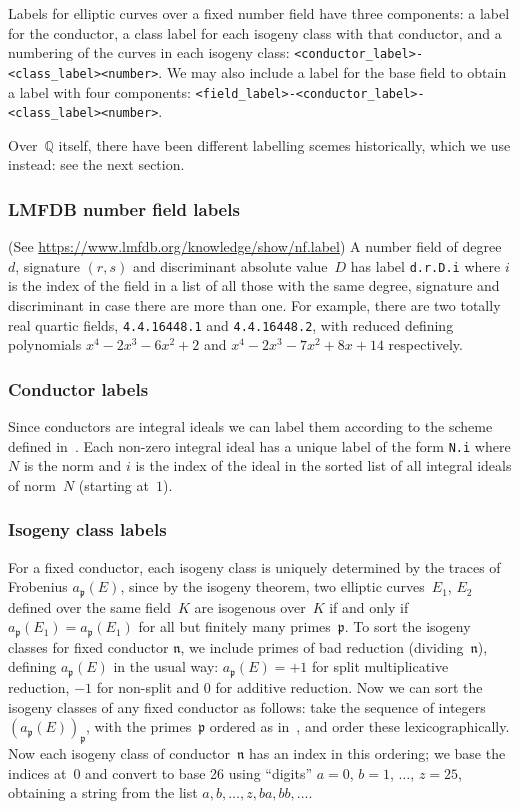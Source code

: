 \documentclass{article}
\theoremstyle{remark}
\def\Q{{\mathbb Q}}
\def\n{{\mathfrak n}}
\def\p{{\mathfrak p}}
\begin{document}
Labels for elliptic curves over a fixed number field have three
components: a label for the conductor, a class label for each isogeny
class with that conductor, and a numbering of the curves in each
isogeny class: {\tt<conductor\_label>-<class\_label><number>}.  We may
also include a label for the base field to obtain a label with four
components:
{\tt<field\_label>-<conductor\_label>-<class\_label><number>}.

Over~$\Q$ itself, there have been different labelling scemes
historically, which we use instead: see the next section.

\subsubsection{LMFDB number field labels}  (See
\url{https://www.lmfdb.org/knowledge/show/nf.label}) A number field of
degree~$d$, signature $(r,s)$ and discriminant absolute value~$D$ has
label {\tt d.r.D.i} where $i$ is the index of the field in a list of
all those with the same degree, signature and discriminant in case
there are more than one.  For example, there are two totally real
quartic fields, {\tt 4.4.16448.1} and {\tt 4.4.16448.2}, with reduced
defining polynomials $x^4 - 2x^3 - 6x^2 + 2$ and $x^4 - 2x^3 - 7x^2 +
8x + 14$ respectively.

\subsubsection{Conductor labels}
Since conductors are integral ideals we can label them according to
the scheme defined in~\cite{CremonaPageSutherland}.  Each non-zero
integral ideal has a unique label of the form {\tt N.i} where $N$ is
the norm and $i$ is the index of the ideal in the sorted list of all
integral ideals of norm~$N$ (starting at~$1$).

\subsubsection{Isogeny class labels}
For a fixed conductor, each isogeny class is uniquely determined by
the traces of Frobenius $a_{\p}(E)$, since by the isogeny theorem, two
elliptic curves~$E_1$, $E_2$ defined over the same field~$K$ are
isogenous over~$K$ if and only if $a_{\p}(E_1)=a_{\p}(E_1)$ for all
but finitely many primes~$\p$.  To sort the isogeny classes for fixed
conductor $\n$, we include primes of bad reduction (dividing~$\n$),
defining $a_{\p}(E)$ in the usual way: $a_{\p}(E)=+1$ for split
multiplicative reduction, $-1$ for non-split and $0$ for additive
reduction.  Now we can sort the isogeny classes of any fixed conductor
as follows: take the sequence of integers $(a_{\p}(E))_{\p}$, with the
primes~$\p$ ordered as in~\cite{CremonaPageSutherland}, and order
these lexicographically.  Now each isogeny class of conductor~$\n$ has
an index in this ordering; we base the indices at~$0$ and convert to
base 26 using ``digits'' $a=0$, $b=1$, $\dots$, $z=25$, obtaining a
string from the list $a, b, \dots, z, ba, bb, \dots$.
\end{document}
